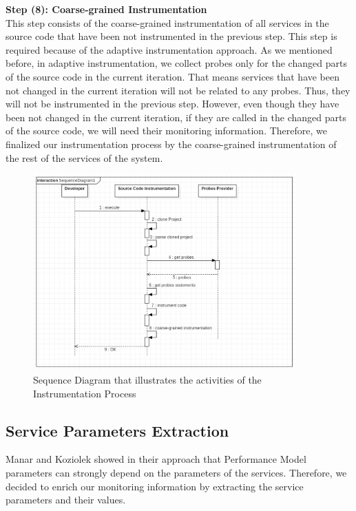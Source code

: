 \textbf{Step (8): Coarse-grained Instrumentation}\\
This step consists of the coarse-grained instrumentation of all services in the source code that have been not instrumented in the previous step.  This step is required because of the adaptive instrumentation approach. As we mentioned before, in adaptive instrumentation, we collect probes only for the changed parts of the source code in the current iteration. That means services that have been not changed in the current iteration will not be related to any probes. Thus, they will not be instrumented in the previous step. However, even though they have been not changed in the current iteration, if they are called in the changed parts of the source code, we will need their monitoring information. Therefore, we finalized our instrumentation process by the coarse-grained instrumentation of the rest of the services of the system.  

\begin{figure}[h]
\centering
\includegraphics[width=0.9\textwidth]{figures/instrumentation_process}
\caption{Sequence Diagram that illustrates the activities of the Instrumentation Process}
\label{fig:instrumentation_process}
\end{figure}

\subsection{Service Parameters Extraction}
\label{sec:Service Parameters Extraction}
Manar and Koziolek showed in their approach \cite{mazkatli2018continuous} that Performance Model parameters can strongly depend on the parameters of the services. Therefore, we decided to enrich our monitoring information by extracting the service parameters and their values. 

